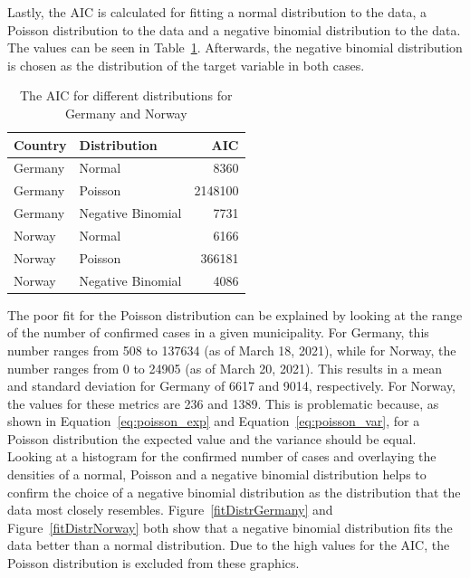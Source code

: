 Lastly, the AIC is calculated for fitting a normal distribution to the data, a Poisson distribution to the data and a negative binomial distribution to the data. The values can be seen in Table~\ref{aic}. Afterwards, the negative binomial distribution is chosen as the distribution of the target variable in both cases. \\
\begin{table}[H] 
\caption{The AIC for different distributions for Germany and Norway \label{aic}}
\begin{tabular}{l l r}
\toprule
\textbf{Country}	& \textbf{Distribution}	& \textbf{AIC} \\
\midrule
Germany & Normal & 8360 \\
Germany & Poisson & 2148100 \\
Germany & Negative Binomial & 7731 \\
Norway & Normal & 6166 \\
Norway & Poisson & 366181 \\
Norway & Negative Binomial & 4086 \\
\bottomrule
\end{tabular}
\end{table} 
The poor fit for the Poisson distribution can be explained by looking at the range of the number of confirmed cases in a given municipality. For Germany, this number ranges from 508 to 137634 (as of March 18, 2021), while for Norway, the number ranges from 0 to 24905 (as of March 20, 2021). This results in a mean and standard deviation for Germany of 6617 and 9014, respectively. For Norway, the values for these metrics are 236 and 1389. This is problematic because, as shown in Equation~\ref{eq:poisson_exp} and Equation~\ref{eq:poisson_var}, for a Poisson distribution the expected value and the variance should be equal. \\
Looking at a histogram for the confirmed number of cases and overlaying the densities of a normal, Poisson and a negative binomial distribution helps to confirm the choice of a negative binomial distribution as the distribution that the data most closely resembles. Figure~\ref{fitDistrGermany} and Figure~\ref{fitDistrNorway} both show that a negative binomial distribution fits the data better than a normal distribution. Due to the high values for the AIC, the Poisson distribution is excluded from these graphics.
